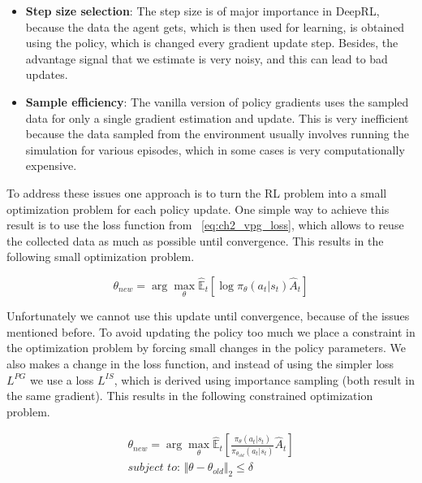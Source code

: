 \begin{itemize}
    \item \textbf{Step size selection}: The step size is of major importance in DeepRL,
          because the data the agent gets, which is then used for learning, is obtained
          using the policy, which is changed every gradient update step. Besides, the advantage
          signal that we estimate is very noisy, and this can lead to bad updates.

    \item \textbf{Sample efficiency}: The vanilla version of policy gradients uses
          the sampled data for only a single gradient estimation and update. This is
          very inefficient because the data sampled from the environment usually involves
          running the simulation for various episodes, which in some cases is very 
          computationally expensive.
\end{itemize}

To address these issues one approach is to turn the RL problem into a small 
optimization problem for each policy update. One simple way to achieve this
result is to use the loss function from ~\ref{eq:ch2_vpg_loss}, which allows to
reuse the collected data as much as possible until convergence. This results
in the following small optimization problem.

\begin{equation}
    \theta_{new} = \arg \max_{\theta} \mathbb{\hat E}_{t} 
                        \left [
                            \log \pi_{\theta}(a_{t}|s_{t}) \hat A_{t}
                        \right ]
\end{equation}

Unfortunately we cannot use this update until convergence, because of the issues
mentioned before. To avoid updating the policy too much we place a constraint in
the optimization problem by forcing small changes in the policy parameters. We also
makes a change in the loss function, and instead of using the simpler loss $L^{PG}$
we use a loss $L^{IS}$, which is derived using importance sampling (both result in
the same gradient). This results in the following constrained optimization problem.

\begin{align}
    \theta_{new} = \arg \max_{\theta} \mathbb{\hat E}_{t} 
                        \left [
                            \frac{\pi_{\theta}(a_{t}|s_{t})}
                                 {\pi_{\theta_{old}}(a_{t}|s_{t})} \hat A_{t}
                        \right ] \nonumber \\
    \textit{subject to: } 
                \Vert \theta - \theta_{old} \Vert_{2} \leq \delta
\end{align}

